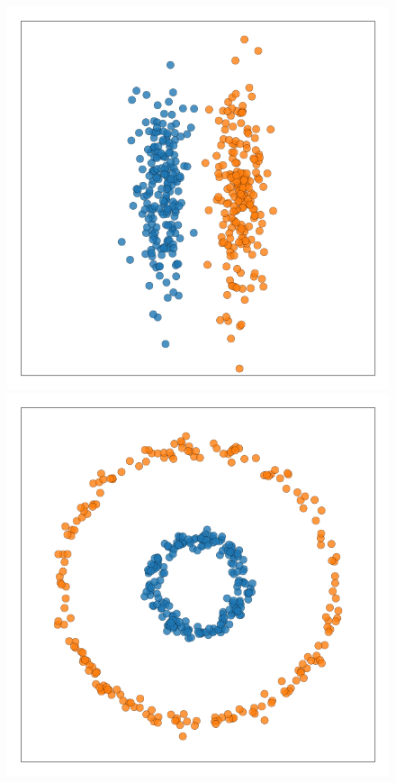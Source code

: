 \documentclass[aps,preprint,nofootinbib,floatfix]{revtex4-1}
\begin{document}
\begin{figure}
\begin{minipage}{0.33\textwidth}
\hspace{.7cm}\includegraphics[width=.82\textwidth]{cigar_data.pdf}
\end{minipage}
\begin{minipage}{0.33\textwidth}
\hspace{.7cm}\includegraphics[width=.82\textwidth]{circles_data.pdf}
\end{minipage}
\begin{minipage}{0.33\textwidth}

\end{minipage}
\end{figure}
\end{document}

